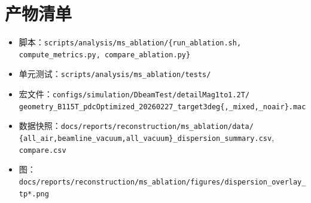 \documentclass[a4paper, 11pt]{article}
\begin{document}
\section{产物清单}

\begin{itemize}[nosep]
  \item 脚本：\verb|scripts/analysis/ms_ablation/{run_ablation.sh, compute_metrics.py, compare_ablation.py}|
  \item 单元测试：\verb|scripts/analysis/ms_ablation/tests/|
  \item 宏文件：\verb|configs/simulation/DbeamTest/detailMag1to1.2T/|\\
        \verb|geometry_B115T_pdcOptimized_20260227_target3deg{,_mixed,_noair}.mac|
  \item 数据快照：\verb|docs/reports/reconstruction/ms_ablation/data/|\\
        \verb|{all_air,beamline_vacuum,all_vacuum}_dispersion_summary.csv|, \verb|compare.csv|
  \item 图：\verb|docs/reports/reconstruction/ms_ablation/figures/dispersion_overlay_tp*.png|
\end{itemize}
\end{document}
